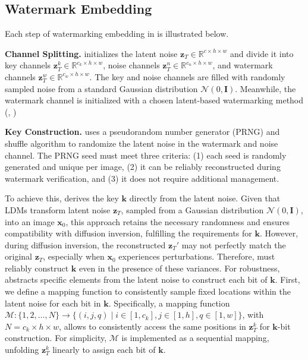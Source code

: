 \subsection{Watermark Embedding}
\label{sec:watermark_embedding}
Each step of watermarking embedding in \tool{} is illustrated below.

\noindent
\textbf{Channel Splitting.}
\tool initializes the latent noise \( \mathbf{z}_T \in \mathbb{R}^{c \times h \times w} \) and divide it into key channels \( \mathbf{z}_T^k \in \mathbb{R}^{c_k \times h \times w} \), noise channels \( \mathbf{z}_T^n \in \mathbb{R}^{c_n \times h \times w} \), and watermark channels \( \mathbf{z}_T^w \in \mathbb{R}^{c_w \times h \times w} \). The key and noise channels are filled with randomly sampled noise from a standard Gaussian distribution \( \mathcal{N}(0, \mathbf{I}) \). Meanwhile, the watermark channel is initialized with a chosen latent-based watermarking method (\eg, \cite{yang2024gaussian})

\noindent
\textbf{Key Construction.}
\tool uses a pseudorandom number generator (PRNG) and shuffle algorithm to randomize the latent noise in the watermark and noise channel. The PRNG seed must meet three criteria: (1) each seed is randomly generated and unique per image, (2) it can be reliably reconstructed during watermark verification, and (3) it does not require additional management.

To achieve this, \tool derives the key \( \mathbf{k} \) directly from the latent noise. Given that LDMs transform latent noise \( \mathbf{z}_T \), sampled from a Gaussian distribution \(\mathcal{N}(0, \mathbf{I})\), into an image \( \mathbf{x}_0 \), this approach retains the necessary randomness and ensures compatibility with diffusion inversion, fulfilling the requirements for \( \mathbf{k} \).
However, during diffusion inversion, the reconstructed \( \mathbf{z}_T' \) may not perfectly match the original \( \mathbf{z}_T \), especially when \( \mathbf{x}_0 \) experiences perturbations. Therefore, \tool must reliably construct \( \mathbf{k} \) even in the presence of these variances. 
For robustness, \tool abstracts specific elements from the latent noise to construct each bit of \( \mathbf{k} \). 
First, we define a mapping function to consistently sample fixed locations within the latent noise for each bit in \( \mathbf{k} \). 
Specifically, a mapping function \( \mathcal{M}: \{1, 2, \dots, N\} \to \{ (i, j, q) \mid i \in [1, c_k], j \in [1, h], q \in [1, w] \} \), with \( N = c_k \times h \times w \), allows \tool to consistently access the same positions in \( \mathbf{z}_T^k \) for \( \mathbf{k} \)-bit construction. For simplicity, \( \mathcal{M} \) is implemented as a sequential mapping, unfolding \(\mathbf{z}_T^k\) linearly to assign each bit of \( \mathbf{k} \).

